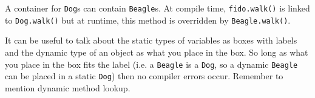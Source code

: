 \begin{blocksection}
\begin{parts}
\begin{solution}[0.7in]
A container for \lstinline$Dog$s can contain \lstinline$Beagle$s. At compile
time, \lstinline$fido.walk()$ is linked to \lstinline$Dog.walk()$ but at
runtime, this method is overridden by \lstinline$Beagle.walk()$.

\begin{meta}
It can be useful to talk about the static types of variables as boxes with labels and the dynamic type 
of an object as what you place in the box. So long as what you place in the box fits the label (i.e. a \lstinline$Beagle$ 
is a \lstinline$Dog$, so a dynamic \lstinline$Beagle$ can be placed in a static \lstinline$Dog$) then no compiler errors occur. Remember to mention dynamic method lookup.
\end{meta}

\end{solution}
\end{parts}
\end{blocksection}

\begin{solution}

\end{solution}
